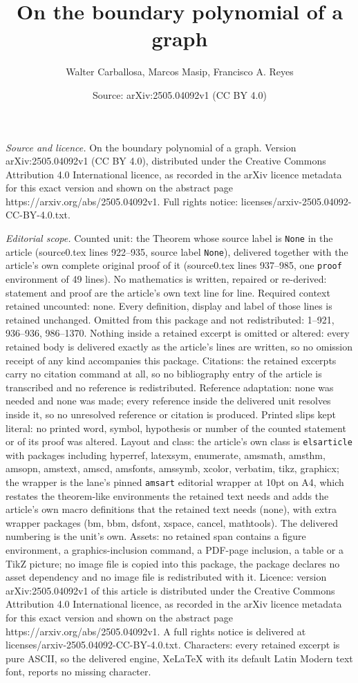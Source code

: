 \documentclass[10pt,a4paper]{amsart}
\title[On the boundary polynomial of a graph]{On the boundary polynomial of a graph}
\author{Walter Carballosa, Marcos Masip, Francisco A. Reyes}
\date{Source: arXiv:2505.04092v1 (CC BY 4.0)}
\begin{document}
\maketitle

\noindent\emph{Source and licence.} On the boundary polynomial of a graph. Version arXiv:2505.04092v1 (CC BY 4.0), distributed under the Creative Commons Attribution 4.0 International licence, as recorded in the arXiv licence metadata for this exact version and shown on the abstract page https://arxiv.org/abs/2505.04092v1. Full rights notice: licenses/arxiv-2505.04092-CC-BY-4.0.txt.\par\smallskip

\noindent\textit{Editorial scope.} Counted unit: the Theorem whose source label is \texttt{None} in the article (source0.tex lines 922--935, source label \texttt{None}), delivered together with the article's own complete original proof of it (source0.tex lines 937--985, one \texttt{proof} environment of 49 lines). No mathematics is written, repaired or re-derived: statement and proof are the article's own text line for line. Required context retained uncounted: none. Every definition, display and label of those lines is retained unchanged. Omitted from this package and not redistributed: 1--921, 936--936, 986--1370. Nothing inside a retained excerpt is omitted or altered: every retained body is delivered exactly as the article's lines are written, so no omission receipt of any kind accompanies this package. Citations: the retained excerpts carry no citation command at all, so no bibliography entry of the article is transcribed and no reference is redistributed. Reference adaptation: none was needed and none was made; every reference inside the delivered unit resolves inside it, so no unresolved reference or citation is produced. Printed slips kept literal: no printed word, symbol, hypothesis or number of the counted statement or of its proof was altered. Layout and class: the article's own class is \texttt{elsarticle} with packages including hyperref, latexsym, enumerate, amsmath, amsthm, amsopn, amstext, amscd, amsfonts, amssymb, xcolor, verbatim, tikz, graphicx; the wrapper is the lane's pinned \texttt{amsart} editorial wrapper at 10pt on A4, which restates the theorem-like environments the retained text needs and adds the article's own macro definitions that the retained text needs (none), with extra wrapper packages (bm, bbm, dsfont, xspace, cancel, mathtools). The delivered numbering is the unit's own. Assets: no retained span contains a figure environment, a graphics-inclusion command, a PDF-page inclusion, a table or a TikZ picture; no image file is copied into this package, the package declares no asset dependency and no image file is redistributed with it. Licence: version arXiv:2505.04092v1 of this article is distributed under the Creative Commons Attribution 4.0 International licence, as recorded in the arXiv licence metadata for this exact version and shown on the abstract page https://arxiv.org/abs/2505.04092v1. A full rights notice is delivered at licenses/arxiv-2505.04092-CC-BY-4.0.txt. Characters: every retained excerpt is pure ASCII, so the delivered engine, XeLaTeX with its default Latin Modern text font, reports no missing character.
\end{document}
